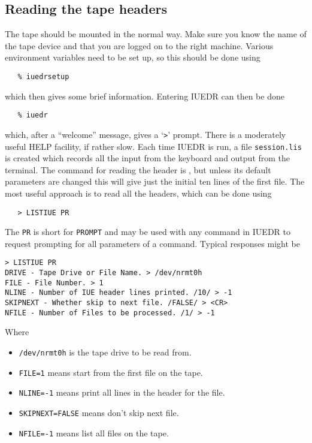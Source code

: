 \subsection{Reading the tape headers}

The tape should be mounted in the normal way. Make sure you know the name
of the tape device and that you are logged on to the right machine.
Various environment variables need to be set up, so this should be done using

\begin{verbatim}
   % iuedrsetup
\end{verbatim}

which then gives some brief information. Entering IUEDR can then be done

\begin{verbatim}
   % iuedr
\end{verbatim}

which, after a ``welcome'' message, gives a `\verb+>+' prompt.
There is a moderately useful HELP facility, if rather slow. Each time IUEDR
is run, a file \verb+session.lis+ is created which records all the input from
the keyboard and output from the terminal. The command for reading the header
is , but unless its default parameters are 
changed this will give just the initial ten lines of the first file.
The most useful approach is to read all the headers, which can be done using

\begin{verbatim}
   > LISTIUE PR
\end{verbatim}

The \verb+PR+ is short for \verb+PROMPT+ and may be used with any command in
IUEDR to request prompting for all parameters of a command.  Typical responses
might be

\begin{verbatim}
> LISTIUE PR
DRIVE - Tape Drive or File Name. > /dev/nrmt0h
FILE - File Number. > 1
NLINE - Number of IUE header lines printed. /10/ > -1
SKIPNEXT - Whether skip to next file. /FALSE/ > <CR>
NFILE - Number of Files to be processed. /1/ > -1
\end{verbatim}

Where

\begin{itemize}
\item \verb+/dev/nrmt0h+ is the tape drive to be read from.
\item \verb+FILE=1+ means start from the first file on the tape.
\item \verb+NLINE=-1+ means print all lines in the header for the file.
\item \verb+SKIPNEXT=FALSE+ means don't skip next file.
\item \verb+NFILE=-1+ means list all files on the tape.
\end{itemize}


